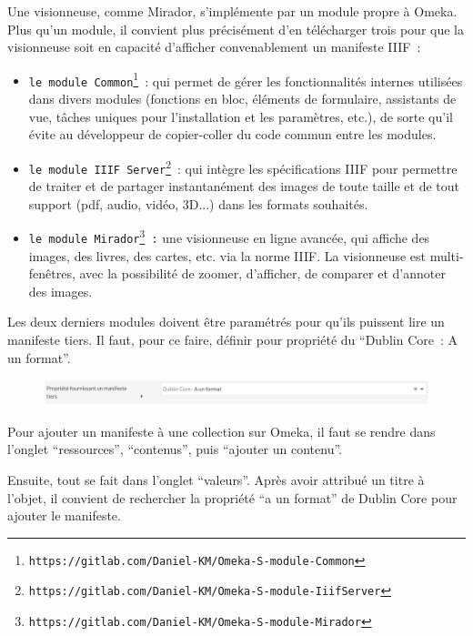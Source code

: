 Une visionneuse, comme Mirador, s’implémente par un module propre à Omeka. Plus qu’un module, il convient plus précisément d’en télécharger trois pour que la visionneuse soit en capacité d’afficher convenablement un manifeste IIIF~:
\begin{itemize}
	\item \texttt{le module Common\footnote{https://gitlab.com/Daniel-KM/Omeka-S-module-Common}}~: qui permet de gérer les fonctionnalités internes utilisées dans divers modules (fonctions en bloc, éléments de formulaire, assistants de vue, tâches uniques pour l'installation et les paramètres, etc.), de sorte qu'il évite au développeur de copier-coller du code commun entre les modules.\par
	\item \texttt{le module IIIF Server\footnote{https://gitlab.com/Daniel-KM/Omeka-S-module-IiifServer}}~: qui intègre les spécifications IIIF pour permettre de traiter et de partager instantanément des images de toute taille et de tout support (pdf, audio, vidéo, 3D...) dans les formats souhaités.\par
	\item \texttt{le module Mirador\footnote{https://gitlab.com/Daniel-KM/Omeka-S-module-Mirador}~:} une visionneuse en ligne avancée, qui affiche des images, des livres, des cartes, etc. via la norme IIIF. La visionneuse est multi-fenêtres, avec la possibilité de zoomer, d'afficher, de comparer et d'annoter des images.
\end{itemize}\par

Les deux derniers modules doivent être paramétrés pour qu’ils puissent lire un manifeste tiers. Il faut, pour ce faire, définir pour propriété du \enquote{Dublin Core~: A un format}.\par
\begin{figure}[H]
	\centering
	\includegraphics[width=\textwidth]{./textes/annexe/omeka-format.jpg}
	\label{fig:info}
\end{figure}

Pour ajouter un manifeste à une collection sur Omeka, il faut se rendre dans l’onglet \enquote{ressources}, \enquote{contenus}, puis \enquote{ajouter un contenu}.\par Ensuite, tout se fait dans l’onglet \enquote{valeurs}. Après avoir attribué un titre à l’objet, il convient de rechercher la propriété \enquote{a un format} de Dublin Core pour ajouter le manifeste.\par

